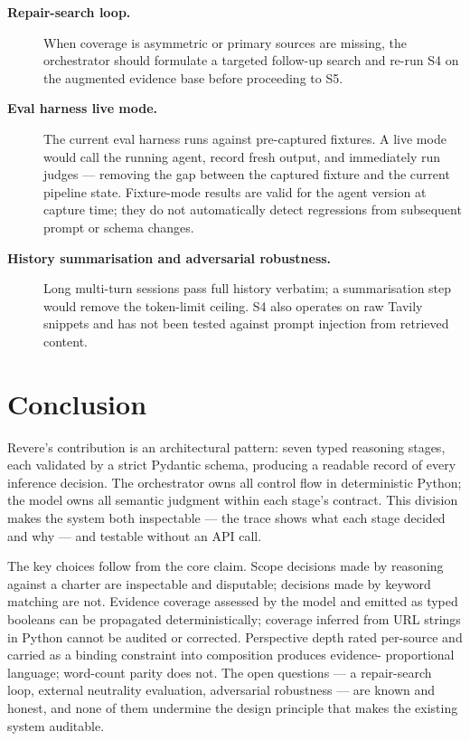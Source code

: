 \documentclass[11pt,letterpaper]{article}
\newcommand{\kw}[1]{\textbf{#1}}
\begin{document}
\begin{description}
  \item[\kw{Repair-search loop.}]
    When coverage is asymmetric or primary sources are missing, the
    orchestrator should formulate a targeted follow-up search and re-run S4
    on the augmented evidence base before proceeding to S5.

  \item[\kw{Eval harness live mode.}]
    The current eval harness runs against pre-captured fixtures. A live mode
    would call the running agent, record fresh output, and immediately run
    judges --- removing the gap between the captured fixture and the current
    pipeline state. Fixture-mode results are valid for the agent version at
    capture time; they do not automatically detect regressions from subsequent
    prompt or schema changes.

  \item[\kw{History summarisation and adversarial robustness.}]
    Long multi-turn sessions pass full history verbatim; a summarisation step
    would remove the token-limit ceiling. S4 also operates on raw Tavily
    snippets and has not been tested against prompt injection from retrieved
    content.
\end{description}


\section{Conclusion}
\label{sec:conclusion}

Revere's contribution is an architectural pattern: seven typed reasoning stages,
each validated by a strict Pydantic schema, producing a readable record of
every inference decision. The orchestrator owns all control flow in deterministic
Python; the model owns all semantic judgment within each stage's contract. This
division makes the system both inspectable --- the trace shows what each stage
decided and why --- and testable without an API call.

The key choices follow from the core claim. Scope decisions made by reasoning
against a charter are inspectable and disputable; decisions made by keyword
matching are not. Evidence coverage assessed by the model and emitted as typed
booleans can be propagated deterministically; coverage inferred from URL strings
in Python cannot be audited or corrected. Perspective depth rated per-source
and carried as a binding constraint into composition produces evidence-
proportional language; word-count parity does not. The open questions --- a
repair-search loop, external neutrality evaluation, adversarial robustness ---
are known and honest, and none of them undermine the design principle that
makes the existing system auditable.
\end{document}
